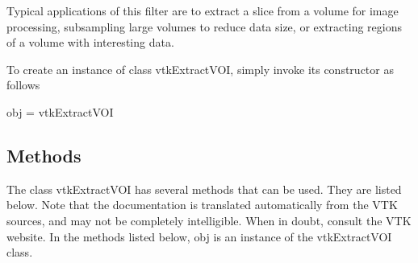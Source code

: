 Typical applications of this filter are to extract a slice from a volume for image processing, subsampling large volumes to reduce data size, or extracting regions of a volume with interesting data.

To create an instance of class vtk\-Extract\-V\-O\-I, simply invoke its constructor as follows \begin{DoxyVerb}  obj = vtkExtractVOI
\end{DoxyVerb}
 \hypertarget{vtkwidgets_vtkxyplotwidget_Methods}{}\subsection{Methods}\label{vtkwidgets_vtkxyplotwidget_Methods}
The class vtk\-Extract\-V\-O\-I has several methods that can be used. They are listed below. Note that the documentation is translated automatically from the V\-T\-K sources, and may not be completely intelligible. When in doubt, consult the V\-T\-K website. In the methods listed below, {\ttfamily obj} is an instance of the vtk\-Extract\-V\-O\-I class. 
